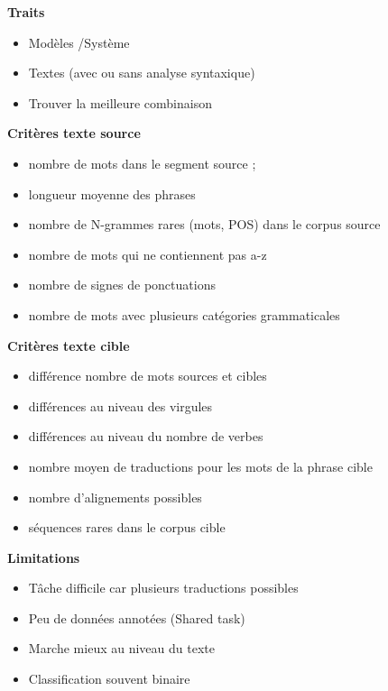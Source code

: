 \textbf{Traits}

\begin{itemize}
    \item Modèles /Système
    \item Textes (avec ou sans analyse syntaxique)
    \item Trouver la meilleure combinaison\\
\end{itemize}

\textbf{Critères texte source}

\begin{itemize}
    \item nombre de mots dans le segment source ;
    \item longueur moyenne des phrases
    \item nombre de N-grammes rares (mots, POS) dans le corpus source
    \item nombre de mots qui ne contiennent pas a-z
    \item nombre de signes de ponctuations
    \item nombre de mots avec plusieurs catégories grammaticales\\
\end{itemize}

\newpage

\textbf{Critères texte cible}

\begin{itemize}
    \item différence nombre de mots sources et cibles
    \item différences au niveau des virgules
    \item différences au niveau du nombre de verbes
    \item nombre moyen de traductions pour les mots de la phrase cible
    \item nombre d'alignements possibles
    \item séquences rares dans le corpus cible\\
\end{itemize}

\textbf{Limitations}

\begin{itemize}
    \item Tâche difficile car plusieurs traductions possibles
    \item Peu de données annotées (Shared task)
    \item Marche mieux au niveau du texte
    \item Classification souvent binaire
\end{itemize}

